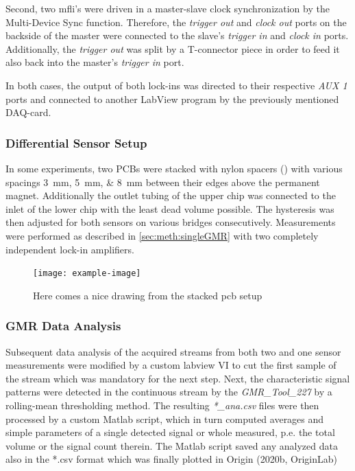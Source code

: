 Second, two \gls{mfli}'s were driven in a master-slave clock synchronization by the Multi-Device Sync function. Therefore, the \textit{trigger out} and \textit{clock out} ports on the backside of the master were connected to the slave's \textit{trigger in} and \textit{clock in} ports. Additionally, the \textit{trigger out} was split by a T-connector piece in order to feed it also back into the master's \textit{trigger in} port.

In both cases, the output of both lock-ins was directed to their respective \textit{AUX 1} ports and connected to another LabView program by the previously mentioned DAQ-card.

\subsubsection{Differential Sensor Setup}
In some experiments, two PCBs were stacked with nylon spacers () with various spacings \SIlist{3;5;8}{\milli\meter} between their edges above the permanent magnet. Additionally the outlet tubing of the upper chip was connected to the inlet of the lower chip with the least dead volume possible. The hysteresis was then adjusted for both sensors on various bridges consecutively. Measurements were performed as described in \ref{sec:meth:singleGMR} with two completely independent lock-in amplifiers.

\begin{figure}[h!]
	\texttt{[image: example-image]} 
	\caption{Here comes a nice drawing from the stacked pcb setup}
\end{figure}

\subsubsection{GMR Data Analysis} \label{sec:meth:gmrDataAnalysis}
Subsequent data analysis of the acquired streams from both two and one sensor measurements were modified by a custom labview VI to cut the first sample of the stream which was mandatory for the next step. Next, the characteristic signal patterns were detected in the continuous stream by the \textit{GMR\_Tool\_227} by a rolling-mean thresholding method. The resulting \textit{*\_ana.csv} files were then processed by a custom Matlab script, which in turn computed averages and simple parameters of a single detected signal or whole measured, p.e. the total volume or the signal count therein. The Matlab script saved any analyzed data also in the *.csv format which was finally plotted in Origin (2020b, OriginLab)

